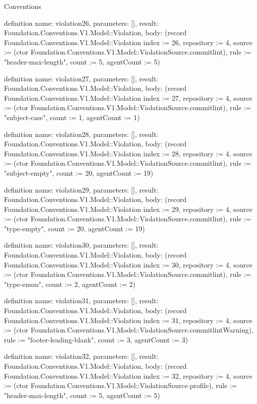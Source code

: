 \begin{lexlean}{Conventions}
\begin{semanticmodule}
definition{
  name: violation26,
  parameters: [],
  result: Foundation.Conventions.V1.Model::Violation,
  body: (record Foundation.Conventions.V1.Model::Violation {index := 26, repository := 4, source := (ctor Foundation.Conventions.V1.Model::ViolationSource.commitlint), rule := "header-max-length", count := 5, agentCount := 5})
}

definition{
  name: violation27,
  parameters: [],
  result: Foundation.Conventions.V1.Model::Violation,
  body: (record Foundation.Conventions.V1.Model::Violation {index := 27, repository := 4, source := (ctor Foundation.Conventions.V1.Model::ViolationSource.commitlint), rule := "subject-case", count := 1, agentCount := 1})
}

definition{
  name: violation28,
  parameters: [],
  result: Foundation.Conventions.V1.Model::Violation,
  body: (record Foundation.Conventions.V1.Model::Violation {index := 28, repository := 4, source := (ctor Foundation.Conventions.V1.Model::ViolationSource.commitlint), rule := "subject-empty", count := 20, agentCount := 19})
}

definition{
  name: violation29,
  parameters: [],
  result: Foundation.Conventions.V1.Model::Violation,
  body: (record Foundation.Conventions.V1.Model::Violation {index := 29, repository := 4, source := (ctor Foundation.Conventions.V1.Model::ViolationSource.commitlint), rule := "type-empty", count := 20, agentCount := 19})
}

definition{
  name: violation30,
  parameters: [],
  result: Foundation.Conventions.V1.Model::Violation,
  body: (record Foundation.Conventions.V1.Model::Violation {index := 30, repository := 4, source := (ctor Foundation.Conventions.V1.Model::ViolationSource.commitlint), rule := "type-enum", count := 2, agentCount := 2})
}

definition{
  name: violation31,
  parameters: [],
  result: Foundation.Conventions.V1.Model::Violation,
  body: (record Foundation.Conventions.V1.Model::Violation {index := 31, repository := 4, source := (ctor Foundation.Conventions.V1.Model::ViolationSource.commitlintWarning), rule := "footer-leading-blank", count := 3, agentCount := 3})
}

definition{
  name: violation32,
  parameters: [],
  result: Foundation.Conventions.V1.Model::Violation,
  body: (record Foundation.Conventions.V1.Model::Violation {index := 32, repository := 4, source := (ctor Foundation.Conventions.V1.Model::ViolationSource.profile), rule := "header-max-length", count := 5, agentCount := 5})
}


\end{semanticmodule}
\end{lexlean}
